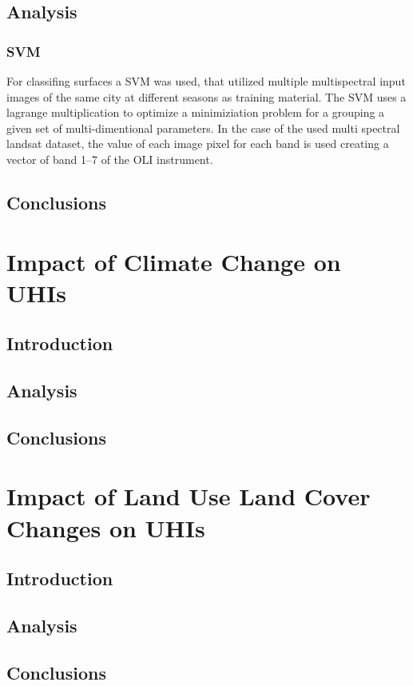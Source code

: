 \documentclass[a4paper, english]{article}
\begin{document}
    \subsection{Analysis}
    \subsubsection{SVM}\label{sec:svm}
    For classifing surfaces a \gls{SVM} was used, that utilized multiple multispectral input images of the same city at different seasons as training material.
    The SVM uses a lagrange multiplication to optimize a minimiziation problem for a grouping a given set of multi-dimentional parameters. 
    In the case of the used multi spectral landsat dataset, the value of each image pixel for each band is used creating a vector of band 1--7 of the OLI instrument. 
    
    
    \subsection{Conclusions}

\section{Impact of Climate Change on UHIs}
    \subsection{Introduction}
    \subsection{Analysis}
    \subsection{Conclusions}

\section{Impact of Land Use Land Cover Changes on UHIs}
    \subsection{Introduction}
    \subsection{Analysis}
    \subsection{Conclusions}
\end{document}
